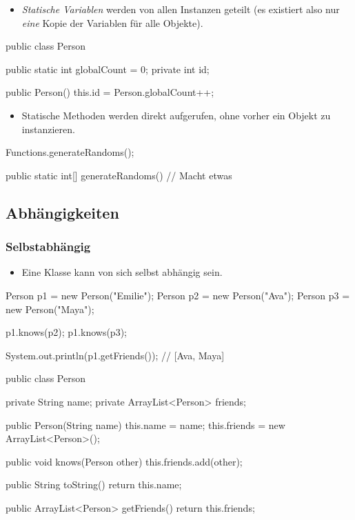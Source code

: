 \documentclass[a4paper,10pt, dvipsnames]{report}
\begin{document}
\begin{itemize}
	\item \textit{Statische Variablen} werden von allen Instanzen geteilt (es existiert also nur \textit{eine} Kopie der Variablen für alle Objekte).
\end{itemize}

\begin{javacodebox}
public class Person {
	public static int globalCount = 0;
	private int id;

	public Person() {
		this.id = Person.globalCount++;
	}
}
\end{javacodebox}

\begin{itemize}
	\item Statische Methoden werden direkt aufgerufen, ohne vorher ein Objekt zu instanzieren.
\end{itemize}

\begin{javacodebox}
Functions.generateRandoms();

public static int[] generateRandoms() {
	// Macht etwas
}
\end{javacodebox}

\subsection{Abhängigkeiten}

\subsubsection{Selbstabhängig}

\begin{itemize}
	\item Eine Klasse kann von sich selbst abhängig sein.
\end{itemize}

\begin{javacodebox}
Person p1 = new Person("Emilie");
Person p2 = new Person("Ava");
Person p3 = new Person("Maya");

p1.knows(p2);
p1.knows(p3);

System.out.println(p1.getFriends()); // [Ava, Maya]
\end{javacodebox}

\begin{javacodebox}
public class Person {
	private String name;
	private ArrayList<Person> friends;

	public Person(String name) {
		this.name = name;
		this.friends = new ArrayList<Person>();
	}

	public void knows(Person other) {
		this.friends.add(other);
	}

	public String toString() {
		return this.name;
	}

	public ArrayList<Person> getFriends() {
		return this.friends;
	}
}
\end{javacodebox}
\end{document}
